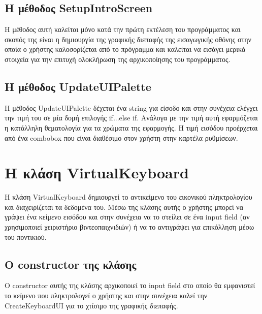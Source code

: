 \subsection{Η μέθοδος SetupIntroScreen}
Η μέθοδος αυτή καλείται μόνο κατά την πρώτη εκτέλεση του προγράμματος και σκοπός της
είναι η δημιουργία της γραφικής διεπαφής της εισαγωγικής οθόνης στην οποία ο χρήστης
καλοσορίζεται από το πρόγραμμα και καλείται να εισάγει μερικά στοιχεία για την επιτυχή
ολοκλήρωση της αρχικοποίησης του προγράμματος. 


\subsection{Η μέθοδος UpdateUIPalette}
Η μέθοδος UpdateUIPalette δέχεται ένα string για είσοδο και στην συνέχεια
ελέγχει την τιμή του σε μία δομή επιλογής if...else if. Ανάλογα με την τιμή αυτή εφαρμόζεται
η κατάλληλη θεματολογία για τα χρώματα της εφαρμογής. Η τιμή εισόδου προέρχεται από
ένα combobox που είναι διαθέσιμο στον χρήστη στην καρτέλα ρυθμίσεων.






\section{Η κλάση VirtualKeyboard}

Η κλάση VirtualKeyboard δημιουργεί το αντικείμενο του εικονικού πληκτρολογίου και διαχειρίζεται
τα δεδομένα του. Μέσω της κλάσης αυτής ο χρήστης μπορεί να γράψει ένα κείμενο εισόδου και στην
συνέχεια να το στείλει σε ένα input field (αν χρησιμοποιεί χειριστήριο βιντεοπαιχνιδιών) ή να 
το αντιγράψει για επικόλληση μέσω του ποντικιού.  


\subsection{Ο constructor της κλάσης}
Ο constructor αυτής της κλάσης αρχικοποιεί το input field στο οποίο θα εμφανιστεί το κείμενο που
πληκτρολογεί ο χρήστης και στην συνέχεια καλεί την CreateKeyboardUI για το χτίσιμο της γραφικής
διεπαφής.



